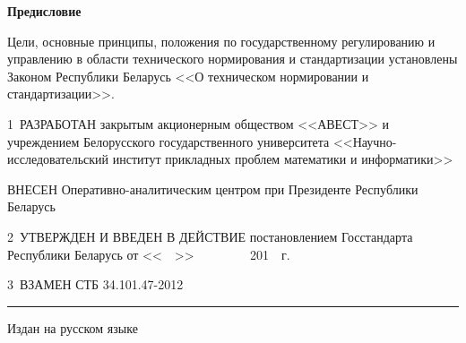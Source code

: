 \rule{0pt}{5mm}

\centerline{\bf Предисловие} 
Цели, основные принципы, положения по государственному регулированию и управлению в 
области технического нормирования и стандартизации установлены Законом Республики Беларусь
<<О техническом нормировании и стандартизации>>. 

\vskip0.2cm

1~РАЗРАБОТАН закрытым акционерным обществом <<АВЕСТ>> и 
учреждением Белорусского государственного университета 
<<Научно-исследовательский  институт прикладных проблем математики и 
информатики>>

ВНЕСЕН Оперативно-аналитическим центром при Президенте 
Республики Беларусь

2~УТВЕРЖДЕН И ВВЕДЕН В ДЕЙСТВИЕ постановлением Госстандарта Республики 
Беларусь от <<$\phantom{22}$>> $\phantom{\text{сентября}}$ 
201$\phantom{6}$~г.~\No~$\phantom{23}$

3~ВЗАМЕН СТБ 34.101.47-2012

\vfill

\hrule
\vskip1mm
Издан на русском языке

\pagebreak
